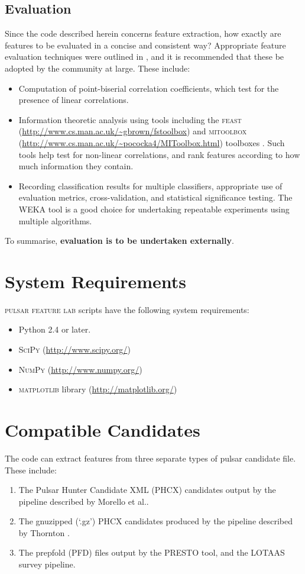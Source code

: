 \documentclass[twoside,a4paper]{refart}
\begin{document}
\subsection{Evaluation}
Since the code described herein concerns feature extraction, how exactly are features to be evaluated in a concise and consistent way? Appropriate feature evaluation techniques were outlined in \cite{Lyon:2015:jk}, and it is recommended that these be adopted by the community at large. These include:
\begin{itemize}
\item Computation of point-biserial correlation coefficients, which test for the presence of linear correlations.
\item Information theoretic analysis using tools including the \textsc{feast} (\url{http://www.cs.man.ac.uk/~gbrown/fstoolbox}) and \textsc{mitoolbox} (\url{http://www.cs.man.ac.uk/~pococka4/MIToolbox.html}) toolboxes \cite{Brown:2012:ap}. Such tools help test for non-linear correlations, and rank features according to how much information they contain.
\item Recording classification results for multiple classifiers, appropriate use of evaluation metrics, cross-validation, and statistical significance testing. The WEKA tool is a good choice for undertaking repeatable experiments using multiple algorithms.
\end{itemize}
To summarise, \textbf{evaluation is to be undertaken externally}.
\section{System Requirements}
\textsc{pulsar feature lab} scripts have the following system requirements:
\begin{itemize}
\item Python 2.4 or later.
\item \textsc{SciPy} (\url{http://www.scipy.org/})
\item \textsc{NumPy} (\url{http://www.numpy.org/})
\item \textsc{matplotlib} library (\url{http://matplotlib.org/})
\end{itemize}

\section{Compatible Candidates}
The code can extract features from three separate types of pulsar candidate file. These include:
\begin{enumerate}
\item The Pulsar Hunter Candidate XML (PHCX) candidates output by the pipeline described by Morello et al.\cite{Morello:2014:eb}.
\item The gnuzipped (`.gz') PHCX candidates produced by the pipeline described by Thornton \cite{ThorntonPhD:1}.
\item The prepfold (PFD) files output by the PRESTO tool, and the LOTAAS survey pipeline.
\end{enumerate}   
\end{document}
